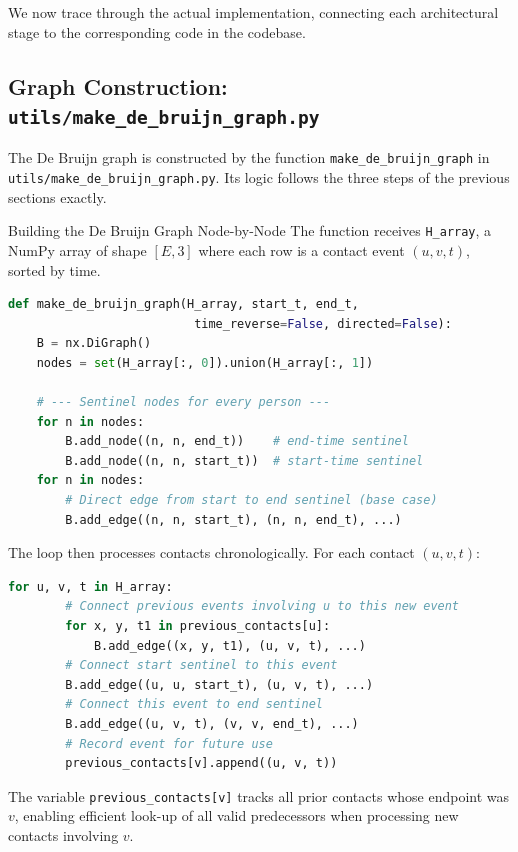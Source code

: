 We now trace through the actual implementation, connecting each architectural stage to the
corresponding code in the codebase.

\subsection{Graph Construction: \texttt{utils/make\_de\_bruijn\_graph.py}}

The De Bruijn graph is constructed by the function \texttt{make\_de\_bruijn\_graph} in
\texttt{utils/make\_de\_bruijn\_graph.py}. Its logic follows the three steps of the previous
sections exactly.

\begin{codewalk}{Building the De Bruijn Graph Node-by-Node}
The function receives \texttt{H\_array}, a NumPy array of shape $[E, 3]$ where each row is a
contact event $(u, v, t)$, sorted by time.

\begin{lstlisting}[language=Python]
def make_de_bruijn_graph(H_array, start_t, end_t,
                          time_reverse=False, directed=False):
    B = nx.DiGraph()
    nodes = set(H_array[:, 0]).union(H_array[:, 1])

    # --- Sentinel nodes for every person ---
    for n in nodes:
        B.add_node((n, n, end_t))    # end-time sentinel
        B.add_node((n, n, start_t))  # start-time sentinel
    for n in nodes:
        # Direct edge from start to end sentinel (base case)
        B.add_edge((n, n, start_t), (n, n, end_t), ...)
\end{lstlisting}

The loop then processes contacts chronologically. For each contact $(u, v, t)$:
\begin{lstlisting}[language=Python]
    for u, v, t in H_array:
        # Connect previous events involving u to this new event
        for x, y, t1 in previous_contacts[u]:
            B.add_edge((x, y, t1), (u, v, t), ...)
        # Connect start sentinel to this event
        B.add_edge((u, u, start_t), (u, v, t), ...)
        # Connect this event to end sentinel
        B.add_edge((u, v, t), (v, v, end_t), ...)
        # Record event for future use
        previous_contacts[v].append((u, v, t))
\end{lstlisting}
The variable \texttt{previous\_contacts[v]} tracks all prior contacts whose endpoint was $v$,
enabling efficient look-up of all valid predecessors when processing new contacts involving $v$.
\end{codewalk}

